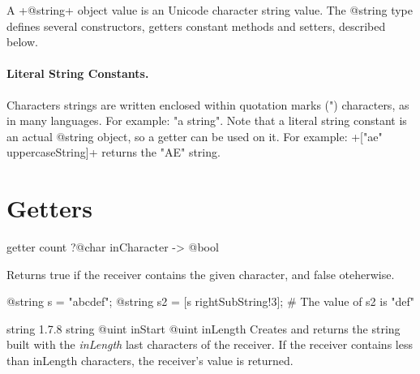 

A \ggs+@string+ object value is an Unicode character string value. The @string type defines several constructors, getters constant methods and setters, described below.

\paragraph{Literal String Constants.}

Characters strings are written enclosed within quotation marks (") characters, as in many languages. For example: "a string". Note that a literal string constant is an actual @string object, so a getter can be used on it. For example: \ggs+["ae" uppercaseString]+ returns the "AE" string.

\section{Getters}


\begin{galgascode}
getter count ?@char inCharacter -> @bool
\end{galgascode}
Returns true if the receiver contains the given character, and false oteherwise.

\begin{galgascode}
@string s = "abcdef";
@string s2 = [s rightSubString!3]; # The value of s2 is "def"
\end{galgascode}

{string}
{1.7.8}
{string}
{@uint inStart}
{@uint inLength}
{Creates and returns the string built with the \emph{inLength} last characters of the receiver. If the receiver contains less than inLength characters, the receiver’s value is returned.}
{}


%
%






